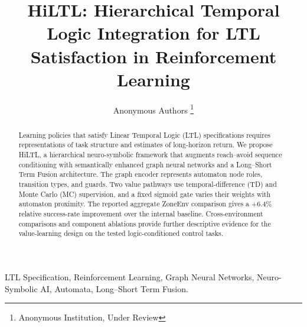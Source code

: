 \documentclass[journal]{IEEEtran}
\begin{document}
\title{HiLTL: Hierarchical Temporal Logic Integration for LTL Satisfaction in Reinforcement Learning}


\author{Anonymous Authors%
\thanks{Anonymous Institution, Under Review}}


\maketitle

\begin{abstract}
Learning policies that satisfy Linear Temporal Logic (LTL) specifications requires representations of task structure and estimates of long-horizon return. We propose HiLTL, a hierarchical neuro-symbolic framework that augments reach--avoid sequence conditioning with semantically enhanced graph neural networks and a Long--Short Term Fusion architecture. The graph encoder represents automaton node roles, transition types, and guards. Two value pathways use temporal-difference (TD) and Monte Carlo (MC) supervision, and a fixed sigmoid gate varies their weights with automaton proximity. The reported aggregate ZoneEnv comparison gives a +6.4\% relative success-rate improvement over the internal baseline. Cross-environment comparisons and component ablations provide further descriptive evidence for the value-learning design on the tested logic-conditioned control tasks.
\end{abstract}

\begin{IEEEkeywords}
LTL Specification, Reinforcement Learning, Graph Neural Networks, Neuro-Symbolic AI, Automata, Long--Short Term Fusion.
\end{IEEEkeywords}






%
\IEEEpeerreviewmaketitle
\end{document}
